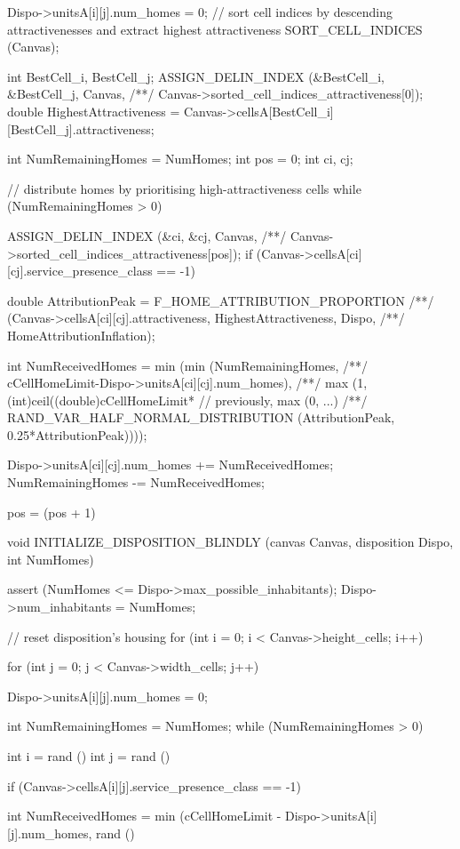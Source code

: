 \begin{C}
{{{			Dispo->unitsA[i][j].num_homes = 0;
		}
	}
	// sort cell indices by descending attractivenesses and extract highest attractiveness
	SORT_CELL_INDICES (Canvas);
	
	int BestCell_i, BestCell_j;
	ASSIGN_DELIN_INDEX (&BestCell_i, &BestCell_j, Canvas,
	/**/ Canvas->sorted_cell_indices_attractiveness[0]);
	double HighestAttractiveness = Canvas->cellsA[BestCell_i][BestCell_j].attractiveness;
	
	int NumRemainingHomes = NumHomes;
	int pos = 0;
	int ci, cj;
	
	// distribute homes by prioritising high-attractiveness cells
	while (NumRemainingHomes > 0){
		
		ASSIGN_DELIN_INDEX (&ci, &cj, Canvas,
		/**/ Canvas->sorted_cell_indices_attractiveness[pos]);
		if (Canvas->cellsA[ci][cj].service_presence_class == -1){
			
			double AttributionPeak = F_HOME_ATTRIBUTION_PROPORTION
			/**/ (Canvas->cellsA[ci][cj].attractiveness, HighestAttractiveness, Dispo,
			/**/ HomeAttributionInflation);
			
			int NumReceivedHomes = min (min (NumRemainingHomes,
			/**/ cCellHomeLimit-Dispo->unitsA[ci][cj].num_homes),
			/**/ max (1, (int)ceil((double)cCellHomeLimit* // previously, max (0, ...)
			/**/ RAND_VAR_HALF_NORMAL_DISTRIBUTION (AttributionPeak, 0.25*AttributionPeak))));
			
			Dispo->unitsA[ci][cj].num_homes += NumReceivedHomes;
			NumRemainingHomes -= NumReceivedHomes;
		}
		pos = (pos + 1) %
	}
}


void INITIALIZE_DISPOSITION_BLINDLY (canvas Canvas, disposition Dispo, int NumHomes){
	
	assert (NumHomes <= Dispo->max_possible_inhabitants);
	Dispo->num_inhabitants = NumHomes;
	
	// reset disposition's housing
	for (int i = 0; i < Canvas->height_cells; i++){
		for (int j = 0; j < Canvas->width_cells; j++){
			
			Dispo->unitsA[i][j].num_homes = 0;
		}
	}
	
	int NumRemainingHomes = NumHomes;
	while (NumRemainingHomes > 0){
		
		int i = rand () %
		int j = rand () %
		
		if (Canvas->cellsA[i][j].service_presence_class == -1){
			int NumReceivedHomes = min (cCellHomeLimit - Dispo->unitsA[i][j].num_homes,
			rand () %
			
}}}
\end{C}
